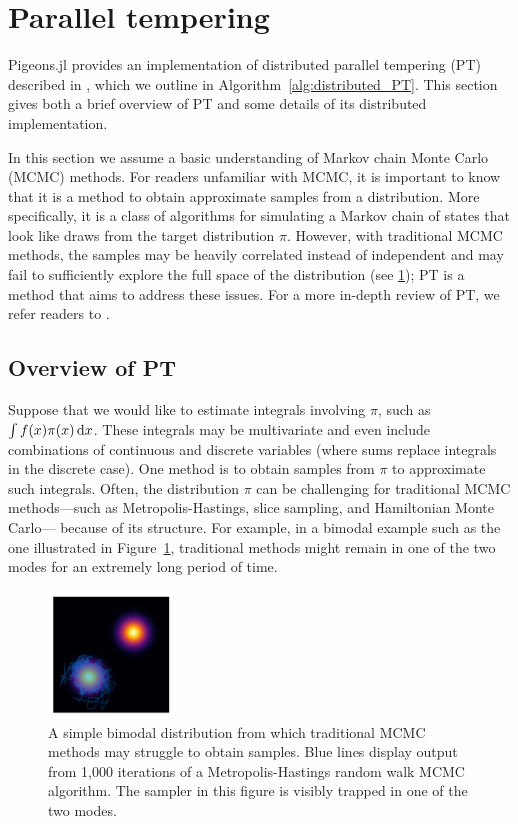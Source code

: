 \section{Parallel tempering}
\label{sec:PT}
Pigeons.jl provides an implementation of distributed parallel tempering (PT) described 
in \cite{syed2021nrpt}, which we outline in Algorithm~\ref{alg:distributed_PT}.
This section gives both a brief overview of PT and some details of 
its distributed implementation.

\medskip 
In this section we assume a basic understanding of 
Markov chain Monte Carlo (MCMC) methods.
For readers unfamiliar with MCMC, it is important to know that 
it is a method to obtain approximate samples from a distribution. 
More specifically, it is a class of algorithms for simulating a Markov chain of 
states that look like draws from the target distribution $\pi$.
However, with traditional 
MCMC methods, the samples may be heavily correlated instead of independent 
and may fail to sufficiently explore the 
full space of the distribution (see \cref{fig:bimodal}); 
PT is a method that aims to address these issues.
For a more in-depth review of PT, we refer readers to \cite{surjanovic2022vpt}.


\subsection{Overview of PT}
Suppose that we would like to estimate integrals involving $\pi$, such as 
$\int f(x) \pi(x) \, \mathrm{d} x$. 
These integrals may be multivariate and even include combinations of 
continuous and discrete variables (where sums replace integrals in the discrete 
case).
One method is to obtain samples from $\pi$ to approximate such integrals.
Often, the distribution 
$\pi$ can be challenging for traditional MCMC methods---such 
as Metropolis-Hastings, slice sampling, and Hamiltonian Monte Carlo---
because of its structure.
For example, in a bimodal example such as the one illustrated in 
Figure~\ref{fig:bimodal},
traditional methods might remain in one of the two modes for an extremely 
long period of time.

\begin{figure}[t]
    \centering
    \includegraphics[width=0.3\textwidth]{../img/bimodal.pdf}
    \caption{A simple bimodal distribution from which traditional 
    MCMC methods may struggle to obtain samples. Blue lines display output 
    from 1,000 iterations of a Metropolis-Hastings random walk MCMC algorithm.
    The sampler in this figure is visibly trapped in one of the two modes.}
    \label{fig:bimodal}
\end{figure}

